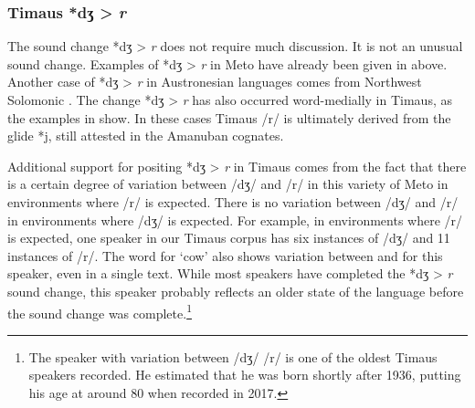 \documentclass[output=paper]{langscibook}
\begin{document}
\subsubsection{Timaus *{dʒ} > \textit{r}}\label{sec:TimJ>r}
The sound change *{dʒ} > \textit{r} does not require much discussion.
It is not an unusual sound change.
Examples of *{dʒ} > \textit{r} in Meto have already
been given in  above.
Another case of *{dʒ} > \textit{r} in Austronesian languages
comes from Northwest Solomonic \citep[221]{ro88}.
The change *{dʒ} > \textit{r} has also occurred word-medially in Timaus,
as the examples in  show.
In these cases Timaus /r/ is ultimately derived
from the glide *j, still attested in the Amanuban cognates.

\begin{table}

	\caption{Timaus medial *{dʒ} > \textit{r}}\label{tab:TimMed*j>r}
\end{table}

Additional support for positing *{dʒ} > \textit{r}
in Timaus comes from the fact that there is a certain degree
of variation between /dʒ/ and /r/ in this variety of Meto
in environments where /r/ is expected.
There is no variation between /dʒ/ and \mbox{/r/}
in environments where /dʒ/ is expected.
For example, in environments where /r/ is expected,
one speaker in our Timaus corpus has six instances of /dʒ/
and 11 instances of /r/.
The word for `cow' also shows variation between  and 
for this speaker, even in a single text.
While most speakers have completed the *{dʒ} > \textit{r} sound change,
this speaker probably reflects an older state of the language
before the sound change was complete.\footnote{%
		The speaker with variation between /dʒ/ {\tl} /r/
		is one of the oldest Timaus speakers recorded.
		He estimated that he was born shortly after 1936,
		putting his age at around 80 when recorded in 2017.
		}
\end{document}
